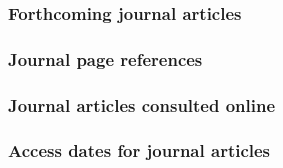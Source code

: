 \documentclass[11pt,letterpaper,oneside]{article}
\begin{document}

\begin{citebib}
\item \cite[155]{lock2015}
\item \cite[651]{wesoky2015}
\item \cite[645]{harper2014}
\item \cite[60]{wilder2013}
\item \cite[52]{beattie1974}
\end{citebib}

\subsubsection{Forthcoming journal articles}

\begin{citebib}
\item \cite{authora}
\end{citebib}

\setcounter{subsubsection}{173}
\subsubsection{Journal page references}

\begin{citebib}
\item \cite{gold2015}
\item \cite[2--3]{paudyal2015}
\end{citebib}

\subsubsection{Journal articles consulted online}

\begin{citebib}
\item \cite[268]{whitney1929}
\item \cite[260--61]{schoenfield2016}
\end{citebib}

\subsubsection{Access dates for journal articles}
\end{document}
